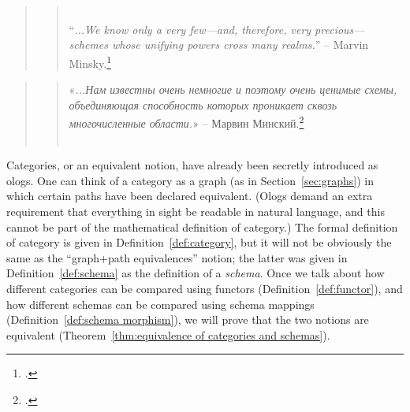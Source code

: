 \documentclass[CT4S-EN-RU]{subfiles}
\begin{document}
\section*{}

\begin{blockENG}
\begin{quote}
\begin{quote}
~\\
“{\it ...We know only a very few—and, therefore, very precious—schemes whose unifying powers cross many realms.}” – Marvin Minsky.\footnote{\cite[Problems of disunity, p. 126]{Min}.}
\end{quote}
\end{quote}
\end{blockENG}

\begin{blockRUS}
\begin{quote}
\begin{quote}
«{\it ...Нам известны очень немногие и поэтому очень ценимые схемы, объединяющая способность которых проникает сквозь многочисленные области.}» – Марвин Минский.\footnote{\cite[Проблемы разъединения, p. 126]{Min}.}~\\~
\end{quote}
\end{quote}
\end{blockRUS}

\begin{blockENG}
Categories, or an equivalent notion, have already been secretly introduced as ologs. One can think of a category as a graph (as in Section~\ref{sec:graphs}) in which certain paths have been declared equivalent. (Ologs demand an extra requirement that everything in sight be readable in natural language, and this cannot be part of the mathematical definition of category.) The formal definition of category is given in Definition~\ref{def:category}, but it will not be obviously the same as the “graph+path equivalences” notion; the latter was given in Definition~\ref{def:schema} as the definition of a {\em schema}. Once we talk about how different categories can be compared using functors (Definition~\ref{def:functor}), and how different schemas can be compared using schema mappings (Definition~\ref{def:schema morphism}), we will prove that the two notions are equivalent (Theorem~\ref{thm:equivalence of categories and schemas}).
\end{blockENG}
\end{document}
